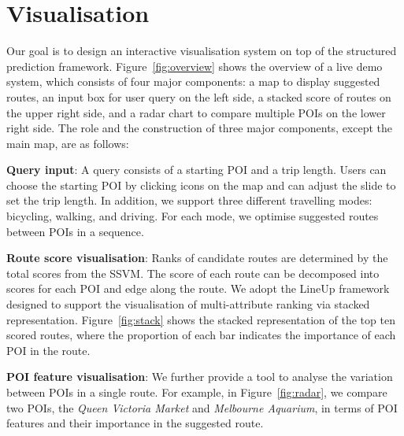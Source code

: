 \section{Visualisation}
Our goal is to design an interactive visualisation system on top of the structured prediction framework.
Figure~\ref{fig:overview} shows the overview of a live demo system, which consists of four major components: a map to display suggested routes, an input box for user query on the left side, a stacked score of routes on the upper right side, and a radar chart to compare multiple POIs on the lower right side. 
The role and the construction of three major components, except the main map, are as follows:

\textbf{Query input}: A query consists of a starting POI and a trip length. 
Users can choose the starting POI by clicking icons on the map and can adjust the slide to set the trip length. 
In addition, we support three different travelling modes: bicycling, walking, and driving.
For each mode, we optimise suggested routes between POIs in a sequence.

\textbf{Route score visualisation}: Ranks of candidate routes are determined by the total scores from the SSVM. 
The score of each route can be decomposed into scores for each POI and edge along the route. 
We adopt the LineUp framework~\cite{gratzl2013lineup} designed to support the visualisation of multi-attribute ranking via stacked representation. 
Figure~\ref{fig:stack} shows the stacked representation of the top ten scored routes, where the proportion of each bar indicates the importance of each POI in the route.

\textbf{POI feature visualisation}: We further provide a tool to analyse the variation between POIs in a single route. 
        For example, in Figure~\ref{fig:radar}, we compare two POIs, the \textit{Queen Victoria Market} and \textit{Melbourne Aquarium}, in terms of POI features and their importance in the suggested route. 

